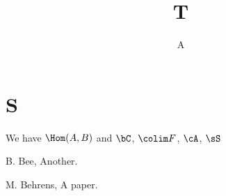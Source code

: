 \documentclass{tac}
\begin{document}
\title{T}\author{A}\dedication{To C}
\maketitle
\section{S}
We have $\Hom(A,B)$ and $\bC$, $\colim F$, $\cA$, $\sS$ \endproofbox
\begin{references}
 B. Bee, Another.
\end{references}
{} M. Behrens, A paper.
\endrefs
\end{document}

